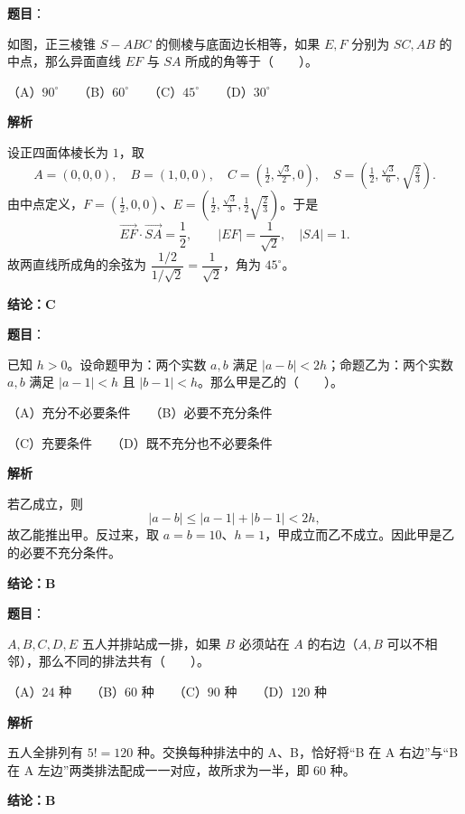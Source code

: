 \begin{answer}

\textbf{题目}：

如图，正三棱锥 $S-ABC$ 的侧棱与底面边长相等，如果 $E,F$ 分别为 $SC,AB$ 的中点，那么异面直线 $EF$ 与 $SA$ 所成的角等于\mbox{（　　）}。
\nopagebreak[4]
\begin{center}\end{center}
\nopagebreak[4]
（A）$90^\circ$　　（B）$60^\circ$　　（C）$45^\circ$　　（D）$30^\circ$

\textbf{解析}

设正四面体棱长为 $1$，取
\nopagebreak[4]
\[
A=(0,0,0),\quad B=(1,0,0),\quad
C=(\tfrac12,\tfrac{\sqrt3}{2},0),\quad
S=(\tfrac12,\tfrac{\sqrt3}{6},\sqrt{\tfrac23}).
\]
由中点定义，$F=(\tfrac12,0,0)$、$E=(\tfrac12,\tfrac{\sqrt3}{3},\tfrac12\sqrt{\tfrac23})$。于是
\nopagebreak[4]
\[
\overrightarrow{EF}\cdot\overrightarrow{SA}=\frac12,
\qquad |EF|=\frac1{\sqrt2},\quad |SA|=1.
\]
故两直线所成角的余弦为 $\dfrac{1/2}{1/\sqrt2}=\dfrac1{\sqrt2}$，角为 $45^\circ$。

\textbf{结论：C}


\end{answer}
\begin{answer}

\textbf{题目}：

已知 $h>0$。设命题甲为：两个实数 $a,b$ 满足 $|a-b|<2h$；命题乙为：两个实数 $a,b$ 满足 $|a-1|<h$ 且 $|b-1|<h$。那么甲是乙的\mbox{（　　）}。

（A）充分不必要条件　　（B）必要不充分条件

（C）充要条件　　（D）既不充分也不必要条件

\textbf{解析}

若乙成立，则
\nopagebreak[4]
\[
|a-b|\le |a-1|+|b-1|<2h,
\]
故乙能推出甲。反过来，取 $a=b=10$、$h=1$，甲成立而乙不成立。因此甲是乙的必要不充分条件。

\textbf{结论：B}


\end{answer}
\begin{answer}

\textbf{题目}：

$A,B,C,D,E$ 五人并排站成一排，如果 $B$ 必须站在 $A$ 的右边（$A,B$ 可以不相邻），那么不同的排法共有\mbox{（　　）}。

（A）$24$ 种　　（B）$60$ 种　　（C）$90$ 种　　（D）$120$ 种

\textbf{解析}

五人全排列有 $5!=120$ 种。交换每种排法中的 A、B，恰好将“B 在 A 右边”与“B 在 A 左边”两类排法配成一一对应，故所求为一半，即 $60$ 种。

\textbf{结论：B}


\end{answer}
